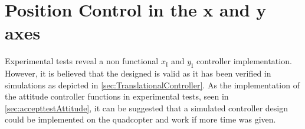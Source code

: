 \section{Position Control in the x and y axes}
%
Experimental tests reveal a non functional $x_{\mathrm{I}}$ and $y_{\mathrm{I}}$ controller implementation. However, it is believed that the designed is valid as it has been verified in simulations as depicted in \autoref{sec:TranslationalController}. As the implementation of the attitude controller functions in experimental tests, seen in \autoref{sec:accepttestAttitude}, it can be suggested that a simulated controller design could be implemented on the quadcopter and work if more time was given.


%
